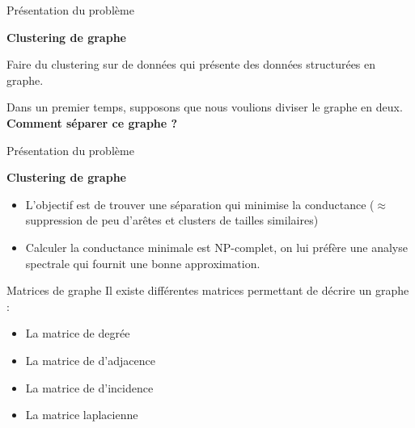 \begin{frame}{Présentation du problème}
    \begin{minipage}{0.49\linewidth}
        \textbf{Clustering de graphe}

        Faire du clustering sur de données qui présente des données structurées en graphe.

        Dans un premier temps, supposons que nous voulions diviser le graphe en deux.
        \\

        \alert{\textbf{Comment séparer ce graphe ?}}
    \end{minipage}
    \begin{minipage}{0.49\linewidth}
    \end{minipage}
\end{frame}
\begin{frame}{Présentation du problème}
    \begin{minipage}{0.49\linewidth}
        \textbf{Clustering de graphe}
        \begin{itemize}
            \item L'objectif est de trouver une séparation qui minimise la \alert{conductance} ($\approx$ suppression de peu d'arêtes et clusters de tailles similaires)
            \item Calculer la conductance minimale est NP-complet, on lui préfère une analyse spectrale qui fournit une bonne approximation.
    \end{itemize}
        
    \end{minipage}
    \begin{minipage}{0.49\linewidth}
    \end{minipage}
\end{frame}

\begin{frame}{Matrices de graphe}
    Il existe différentes matrices permettant de décrire un graphe :
    \begin{itemize}
        \item La matrice de degrée
        \item La matrice de d'adjacence
        \item La matrice de d'incidence
        \item La matrice laplacienne
    \end{itemize}
\end{frame}

